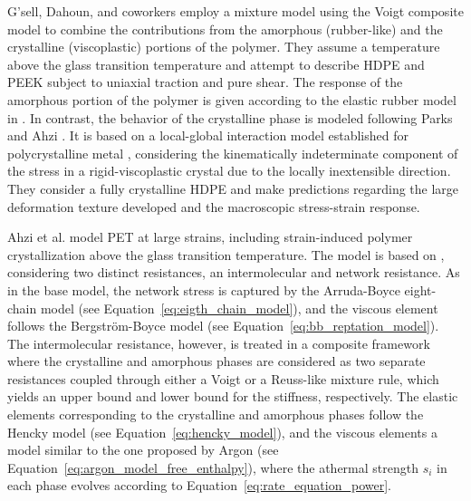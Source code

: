 G'sell, Dahoun, and coworkers \citep{gsellEvolutionMicrostructureSemicrystalline1994, dahounPlasticBehaviorDeformation1995} employ a mixture model using the Voigt composite model to combine the contributions from the amorphous (rubber-like) and the crystalline (viscoplastic) portions of the polymer.
They assume a temperature above the glass transition temperature and attempt to describe HDPE and PEEK subject to uniaxial traction and pure shear.
The response of the amorphous portion of the polymer is given according to the elastic rubber model in \cite{wuImprovedNetworkModels1993}.
 In contrast, the behavior of the crystalline phase is modeled following Parks and Ahzi \citep{parksPolycrystallinePlasticDeformation1990}.
It is based on a local-global interaction model established for polycrystalline metal \citep{molinariSelfConsistentApproach1987}, considering the kinematically indeterminate component of the stress in a rigid-viscoplastic crystal due to the locally inextensible direction.
They consider a fully crystalline HDPE and make predictions regarding the large deformation texture developed and the macroscopic stress-strain response.


Ahzi et al. \citep{ahziModelingDeformationBehavior2003} model PET at large strains, including strain-induced polymer crystallization above the glass transition temperature.
The model is based on \citep{boyceConstitutiveModelFinite2000}, considering two distinct resistances, an intermolecular and network resistance.
As in the base model, the network stress is captured by the Arruda-Boyce eight-chain model (see Equation~\eqref{eq:eigth_chain_model}), and the viscous element follows the Bergström-Boyce model (see Equation~\eqref{eq:bb_reptation_model}).
The intermolecular resistance, however, is treated in a composite framework where the crystalline and amorphous phases are considered as two separate resistances coupled through either a Voigt or a Reuss-like mixture rule, which yields an upper bound and lower bound for the stiffness, respectively.
The elastic elements corresponding to the crystalline and amorphous phases follow the Hencky model (see Equation~\eqref{eq:hencky_model}), and the viscous elements a model similar to the one proposed by Argon (see Equation~\eqref{eq:argon_model_free_enthalpy}), where the athermal strength $s_i$ in each phase evolves according to Equation~\eqref{eq:rate_equation_power}.

